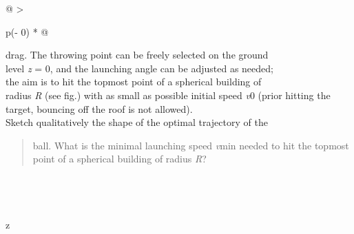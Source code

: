 \documentclass[
]{article}
\begin{document}
\begin{longtable}[]{@{}
  >{\raggedright\arraybackslash}p{(\columnwidth - 0\tabcolsep) * }@{}}
drag. The throwing point can be freely selected on the ground \\
level \emph{z} = 0, and the launching angle can be adjusted as
needed; \\
the aim is to hit the topmost point of a spherical building of \\
radius \emph{R} (see ﬁg.) with as small as possible initial speed
\emph{v}0 (prior hitting the target, bouncing oﬀ the roof is not
allowed). \\
Sketch qualitatively the shape of the optimal trajectory of the \\
\begin{minipage}[t]{\linewidth}\raggedright
\begin{quote}
ball. What is the minimal launching speed \emph{v}min needed to hit the
topmost point of a spherical building of radius \emph{R}?
\end{quote}
\end{minipage} \\
\bottomrule
\end{longtable}

\begin{longtable}[]{@{}l@{}}
\toprule
\endhead
 \\
\bottomrule
\end{longtable}

\begin{longtable}[]{@{}l@{}}
\toprule
\endhead
 \\
\bottomrule
\end{longtable}

z
\end{document}
